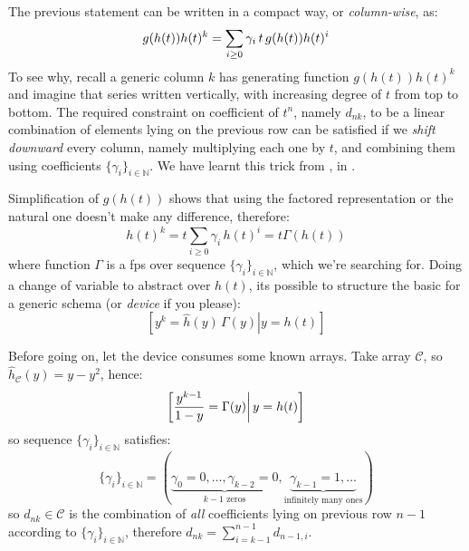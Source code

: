 The previous statement can be written in a compact way, or \emph{column-wise}, as:
\begin{displaymath}
    g(h(t))h(t)^k = \sum_{i\geq0}{\gamma_i\,t\,g(h(t)) h(t)^i}\\
\end{displaymath}
To see why, recall a generic column 
$k$ has generating function $g(h(t))h(t)^k$ and imagine that series written vertically, 
with increasing degree of $t$ from top to bottom.
The required constraint on coefficient of $t^n$, namely $d_{nk}$, 
to be a linear combination of elements lying on the previous row 
can be satisfied if we \emph{shift downward} every column,
namely multiplying each one by $t$, and combining them using coefficients
$\lbrace \gamma_{i} \rbrace_{i\in\mathbb{N}}$. 
We have learnt this trick from \citeauthor{shapiro:1991}, in \cite{shapiro:1991}.

Simplification of $g(h(t))$ shows that using the factored representation or
the natural one doesn't make any difference, therefore:
\begin{displaymath}
    h(t)^k = t \sum_{i\geq 0}{\gamma_i\,h(t)^i} = t \Gamma(h(t))
\end{displaymath}
where function $\Gamma$ is a \ac{fps} over sequence 
$\lbrace \gamma_{i} \rbrace_{i\in\mathbb{N}}$, which we're searching for.
Doing a change of variable to abstract over $h(t)$, its possible to
structure the basic for a generic schema (or \emph{device} if you please):
\begin{equation}
    \left.\left[y^{k} = \hat{h}(y)\,\Gamma(y) \right| y = h(t) \right]
    \label{eq:localizing:A:sequence}
\end{equation}

Before going on, let the device consumes some known arrays. Take 
array $\mathcal{C}$, so $\hat{h}_{\mathcal{C}}(y) = y-y^2$, hence:
\begin{displaymath}
    \left.\left[\frac{y^{k-1}}{1-y} =  \Gamma(y) \right| y = h(t) \right]\\
\end{displaymath}
so sequence $\lbrace \gamma_{i} \rbrace_{i\in\mathbb{N}}$ satisfies:
\begin{displaymath}
    \lbrace \gamma_{i} \rbrace_{i\in\mathbb{N}} = 
        \left(\underbrace{\gamma_{0}=0,\ldots,\gamma_{k-2}=0}_{k-1 \text{ zeros}},
            \underbrace{\gamma_{k-1}=1, \ldots}_{\text{infinitely many ones}} \right)
\end{displaymath}
so $d_{nk}\in\mathcal{C}$ is the combination of \emph{all} coefficients
lying on previous row $n-1$ according to $\lbrace \gamma_{i} \rbrace_{i\in\mathbb{N}}$,
therefore $d_{nk}=\sum_{i=k-1}^{n-1}{d_{n-1,i}}$.

